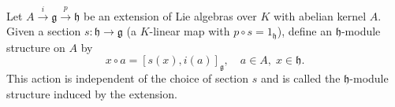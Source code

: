 Let $A \xrightarrow{i} \mathfrak{g} \xrightarrow{p} \mathfrak{h}$ be an extension of Lie algebras over $K$ with abelian kernel $A$. Given a section $s : \mathfrak{h} \to \mathfrak{g}$ (a $K$-linear map with $p \circ s = 1_{\mathfrak{h}}$), define an $\mathfrak{h}$-module structure on $A$ by
$$x \circ a = [s(x), i(a)]_{\mathfrak{g}}, \quad a \in A,\; x \in \mathfrak{h}.$$
This action is independent of the choice of section $s$ and is called the $\mathfrak{h}$-module structure induced by the extension.
